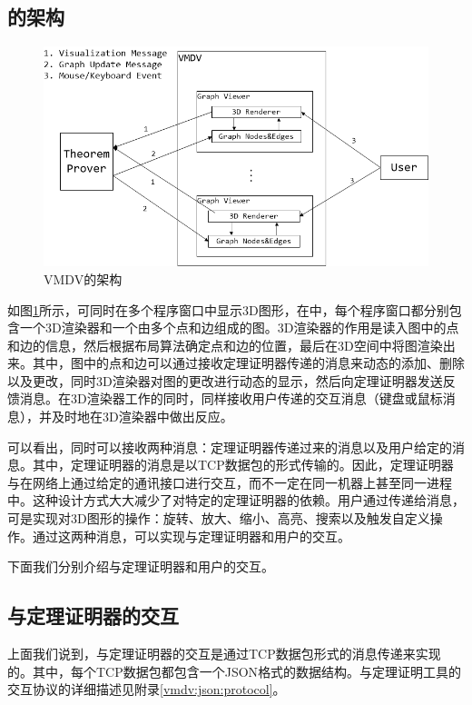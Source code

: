 \subsection{的架构}
\begin{figure}[!h]
	\scriptsize
	\centering
	\includegraphics[width=12cm]{./Img/architecture.png}
	\caption{\textsf{VMDV}的架构}
	\label{fig:architecture}
\end{figure}
如图\ref{fig:architecture}所示，可同时在多个程序窗口中显示3D图形，在中，每个程序窗口都分别包含一个3D渲染器和一个由多个点和边组成的图。3D渲染器的作用是读入图中的点和边的信息，然后根据布局算法确定点和边的位置，最后在3D空间中将图渲染出来。其中，图中的点和边可以通过接收定理证明器传递的消息来动态的添加、删除以及更改，同时3D渲染器对图的更改进行动态的显示，然后向定理证明器发送反馈消息。在3D渲染器工作的同时，同样接收用户传递的交互消息（键盘或鼠标消息），并及时地在3D渲染器中做出反应。

可以看出，同时可以接收两种消息：定理证明器传递过来的消息以及用户给定的消息。其中，定理证明器的消息是以\textsf{TCP}数据包的形式传输的。因此，定理证明器与在网络上通过给定的通讯接口进行交互，而不一定在同一机器上甚至同一进程中。这种设计方式大大减少了对特定的定理证明器的依赖。用户通过传递给消息，可是实现对3D图形的操作：旋转、放大、缩小、高亮、搜索以及触发自定义操作。通过这两种消息，可以实现与定理证明器和用户的交互。

下面我们分别介绍与定理证明器和用户的交互。
\subsection{与定理证明器的交互}
上面我们说到，与定理证明器的交互是通过\textsf{TCP}数据包形式的消息传递来实现的。其中，每个\textsf{TCP}数据包都包含一个\textsf{JSON}格式的数据结构。与定理证明工具的交互协议的详细描述见附录\ref{vmdv:json:protocol}。

